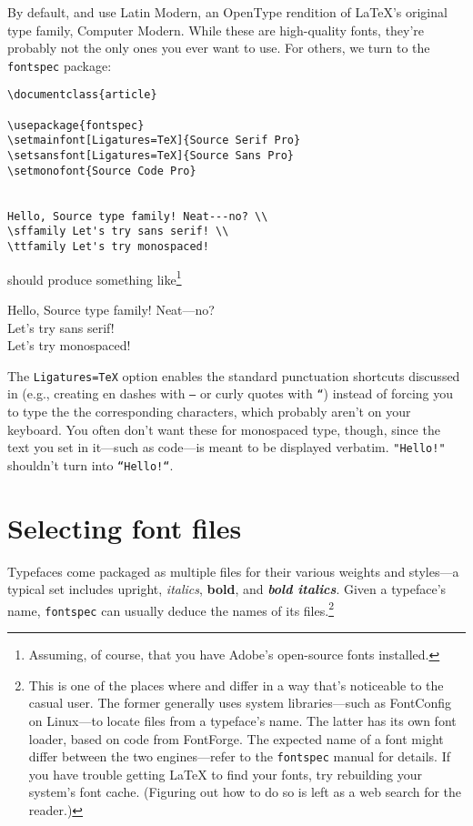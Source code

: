 By default, \LuaLaTeX{} and \XeLaTeX{} use Latin Modern,
an OpenType rendition of \LaTeX's original type family, Computer Modern.
While these are high-quality fonts,
they're probably not the only ones you ever want to use.
For others, we turn to the \texttt{fontspec} package:
\begin{leftfigure}
\begin{lstlisting}
\documentclass{article}

\usepackage{fontspec}
\setmainfont[Ligatures=TeX]{Source Serif Pro}
\setsansfont[Ligatures=TeX]{Source Sans Pro}
\setmonofont{Source Code Pro}


Hello, Source type family! Neat---no? \\
\sffamily Let's try sans serif! \\
\ttfamily Let's try monospaced!

\end{lstlisting}
\end{leftfigure}
should produce something like\footnote{Assuming, of course,
that you have Adobe's open-source fonts installed.\punckern{}}
\begin{leftfigure}
 Hello, Source type family! Neat---no? \\
 Let's try sans serif! \\
 Let's try monospaced!
\end{leftfigure}
The \verb|Ligatures=TeX| option enables the standard punctuation
shortcuts discussed in  (e.g., creating en dashes with
\texttt{--} or curly quotes with \texttt{``}) instead of forcing you
to type the the corresponding characters, which probably aren't on your keyboard.
You often don't want these for monospaced type, though,
since the text you set in it---such as code---is meant to be displayed
verbatim. \verb|"Hello!"| shouldn't turn into
\verb|“Hello!“|.

\section{Selecting font files}

Typefaces come packaged as multiple files for their various
weights and styles---a typical set includes upright,
\textit{italics},
\textbf{bold}, and
\textit{\textbf{bold italics}}.
Given a typeface's name,
\texttt{fontspec} can usually deduce the names of its
files.\punckern\footnote{This is
one of the places where \XeLaTeX{} and \LuaLaTeX{}
differ in a way that's noticeable to the casual user.
The former generally uses system libraries---such as FontConfig on Linux---to
locate files from a typeface's name.
The latter has its own font loader,
based on code from FontForge.\punckern{}
The expected name of a font might differ between the two engines---refer
to the \texttt{fontspec} manual for details.
If you have trouble getting \LaTeX{} to find your fonts,
try rebuilding your system's font cache.
(Figuring out how to do so is left as a web search for the reader.)}

